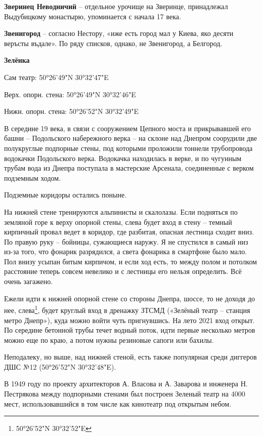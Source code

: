 \medskip

\textbf{Зверинец Неводничий} – отдельное урочище на Зверинце, принадлежал Выдубицкому монастырю, упоминается с начала 17 века.\\

\medskip

\textbf{Звенигород} – согласно Нестору, «иже есть город мал у Киева, яко десяти веръсты въдале». По ряду списков, однако, не Звенигород, а Белгород.\\

\medskip


\textbf{Зелёнка}

Сам театр: 50°26'49"N 30°32'47"E

Верх. опорн. стена: 50°26'49"N 30°32'46"E

Нижн. опорн. стена: 50°26'52"N 30°32'49"E

В середине 19 века, в связи с сооружением Цепного моста и прикрывавшей его башни – Подольского набережного верка – на склоне над Днепром соорудили две полукруглые подпорные стены, под которыми проложили тоннели трубопровода водокачки Подольского верка. Водокачка находилась в верке, и по чугунным трубам вода из Днепра поступала в мастерские Арсенала, соединенные с верком подземным ходом. 

Подземные коридоры остались поныне. 

На нижней стене тренируются альпинисты и скалолазы. Если подняться по земляной горе к верху опорной стены, слева будет вход в стену – темный кирпичный провал ведет в коридор, где разбитая, опасная лестница сходит вниз. По правую руку – бойницы, сужающиеся наружу. Я не спустился в самый низ из-за того, что фонарик разрядился, а света фонарика в смартфоне было мало. Пол внизу усыпан битым кирпичом, и если ход есть, то между полом и потолком расстояние теперь совсем невелико и с лестницы его нельзя определить. Всё очень загажено. 

Ежели идти к нижней опорной стене со стороны Днепра, шоссе, то не доходя до нее, слева\footnote{50°26'52"N 30°32'52"E}, будет круглый вход в дренажку ЗТСМД («Зелёный театр – станция метро Днепр»), куда можно войти чуть пригнувшись. На лето 2021 вход открыт. По середине бетонной трубы течет водный поток, идти первые несколько метров можно еще по краю, а потом нужны резиновые сапоги или бахилы.

Неподалеку, но выше, над нижней стеной, есть также популярная среди диггеров ДШС №12 (50°26'52"N 30°32'48"E).

В 1949 году по проекту архитекторов А. Власова и А. Заварова и инженера Н. Пестрякова между подпорными стенами был построен Зеленый театр на 4000 мест, использовавшийся в том числе как кинотеатр под открытым небом.

